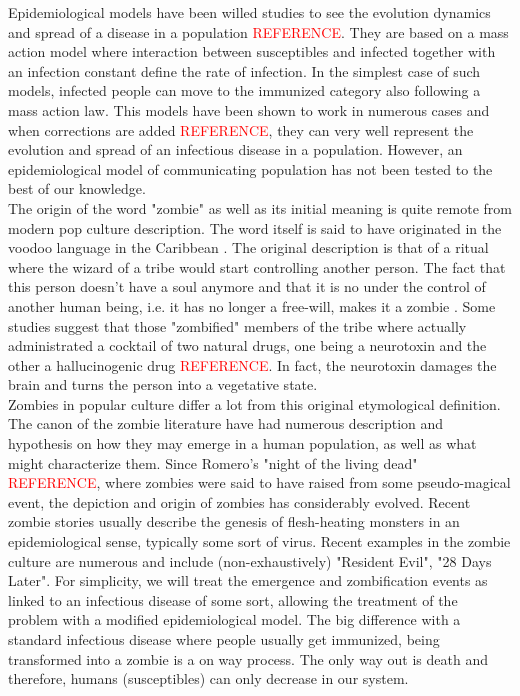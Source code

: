 \documentclass[11pt]{article}
\begin{document}
Epidemiological models have been willed studies to see the evolution dynamics and spread of a disease in a population \textcolor{red}{REFERENCE}. They are based on a mass action model where interaction between susceptibles and infected together with an infection constant define the rate of infection. In the simplest case of such models, infected people can move to the immunized category also following a mass action law. This models have been shown to work in numerous cases and  when corrections are added \textcolor{red}{REFERENCE}, they can very well represent the evolution and spread of an infectious disease in a population. However, an epidemiological model of communicating population has not been tested to the best of our knowledge. \\

The origin of the word "zombie" as well as its initial meaning is quite remote from modern pop culture description. The word itself is said to have originated in the voodoo language in the Caribbean \cite{drezner}. The original description is that of a ritual where the wizard of a tribe would start controlling another person. The fact that this person doesn't have a soul anymore and that it is no under the control of another human being, i.e. it has no longer a free-will, makes it a zombie \cite{drezner}. Some studies suggest that those "zombified" members of the tribe where actually administrated a cocktail of two natural drugs, one being a neurotoxin and the other a hallucinogenic drug \textcolor{red}{REFERENCE}. In fact, the neurotoxin damages the brain and turns the person into a vegetative state.\\

Zombies in popular culture differ a lot from this original etymological definition. The canon of the zombie literature have had numerous description and hypothesis on how they may emerge in a human population, as well as what might characterize them. Since Romero's "night of the living dead" \textcolor{red}{REFERENCE}, where zombies were said to have raised from some pseudo-magical event, the depiction and origin of zombies has considerably evolved. Recent zombie stories usually describe the genesis of flesh-heating monsters in an epidemiological sense, typically some sort of virus. Recent examples in the zombie culture are numerous and include (non-exhaustively) "Resident Evil", "28 Days Later". For simplicity, we will treat the emergence and zombification events as linked to an infectious disease of some sort, allowing the treatment of the problem with a modified epidemiological model. The big difference with a standard infectious disease where people usually get immunized, being transformed into a zombie is a on way process. The only way out is death and therefore, humans (susceptibles) can only decrease in our system.\\
\end{document}
